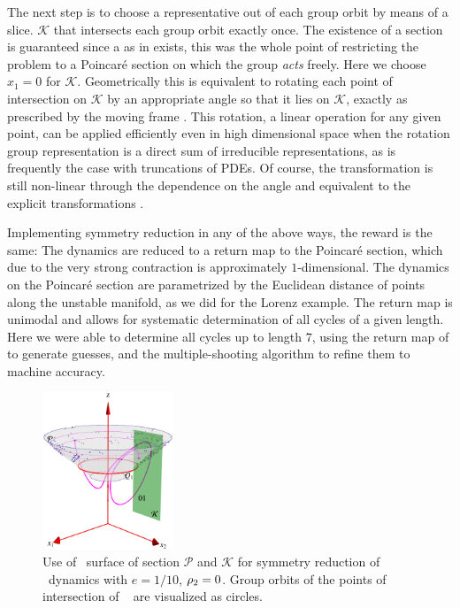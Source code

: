 The next step is to choose a representative out of each group
orbit by means of a slice. $\mathcal{K}$ that
intersects each group orbit exactly once. The existence of a
section is guaranteed since a {\csection} as in
 exists, this was the whole point of
restricting the problem to a Poincar\'e section on which the
group \emph{acts} freely. Here we choose $x_1=0$ for
$\mathcal{K}$. Geometrically this is equivalent to rotating
each point of intersection on $\mathcal{K}$ by an appropriate
angle so that it lies on $\mathcal{K}$, exactly as prescribed
by the moving frame . This rotation, a linear
operation for any given point, can be applied efficiently
even in high dimensional space when the rotation group
representation is a direct sum of irreducible
representations, as is frequently the case with truncations
of PDEs. Of course, the transformation is still non-linear
through the dependence on the angle and equivalent to the
explicit transformations .

Implementing symmetry reduction in any of the above ways, the
reward is the same: The dynamics are reduced to a return map
to the Poincar\'e section, which due to the very strong
contraction is approximately $1$-dimensional. The dynamics on
the Poincar\'e section are parametrized by the Euclidean
distance of points along the unstable manifold, as we did for
the Lorenz example. The return map is unimodal and allows for
systematic determination of all cycles of a given length.
Here we were able to determine all cycles up to length $7$,
using the return map of  to generate
guesses, and the multiple-shooting algorithm
to refine them to machine accuracy.

\begin{figure}[ht]
\begin{center}
  \includegraphics[width=0.35\textwidth]{../figs/CLEmartini}
\end{center}
\caption{
Use of \Poincare\ surface of section $\mathcal{P}$ and
{\csection} $\mathcal{K}$ for symmetry reduction of \CLe\
dynamics with $e=1/10$, $\rho_2=0$. Group orbits of the
points of intersection of \rpo\  are visualized as
circles.
    }
\label{fig:CLEmartini}
\end{figure}
